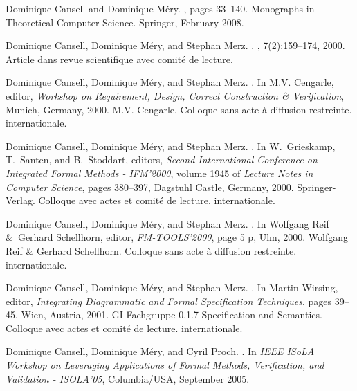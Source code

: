 \documentclass[ 12pt]{article}
\begin{document}
\begin{thebibliography}{100}
Dominique Cansell and Dominique M{\'e}ry.
,
  pages 33--140.
\newblock Monographs in Theoretical Computer Science. {Springer}, February
  2008.

Dominique Cansell, Dominique M{\'e}ry, and Stephan Merz.
.
, 7(2):159--174, 2000.
\newblock Article dans revue scientifique avec comit{\'e} de lecture.

Dominique Cansell, Dominique M{\'e}ry, and Stephan Merz.
.
\newblock In M.V. Cengarle, editor, {\em {Workshop on Requirement, Design,
  Correct Construction \& Verification}}, Munich, Germany, 2000. {M.V.
  Cengarle}.
\newblock Colloque sans acte {\`a} diffusion restreinte. internationale.

Dominique Cansell, Dominique M{\'e}ry, and Stephan Merz.
.
\newblock In W.~Grieskamp, T.~Santen, and B.~Stoddart, editors, {\em {Second
  International Conference on Integrated Formal Methods - IFM'2000}}, volume
  1945 of {\em Lecture Notes in Computer Science}, pages 380--397, Dagstuhl
  Castle, Germany, 2000. {Springer-Verlag}.
\newblock Colloque avec actes et comit{\'e} de lecture. internationale.

Dominique Cansell, Dominique M{\'e}ry, and Stephan Merz.
.
\newblock In Wolfgang Reif \&~Gerhard Schellhorn, editor, {\em
  {FM-TOOLS'2000}}, page 5 p, Ulm, 2000. {Wolfgang Reif \& Gerhard Schellhorn}.
\newblock Colloque sans acte {\`a} diffusion restreinte. internationale.

Dominique Cansell, Dominique M{\'e}ry, and Stephan Merz.
.
\newblock In Martin Wirsing, editor, {\em {Integrating Diagrammatic and Formal
  Specification Techniques}}, pages 39--45, Wien, Austria, 2001. {GI Fachgruppe
  0.1.7 Specification and Semantics}.
\newblock Colloque avec actes et comit{\'e} de lecture. internationale.

Dominique Cansell, Dominique M{\'e}ry, and Cyril Proch.
.
\newblock In {\em {IEEE ISoLA Workshop on Leveraging Applications of Formal
  Methods, Verification, and Validation - ISOLA'05}}, Columbia/USA, September
  2005.


\end{thebibliography}
\end{document}
